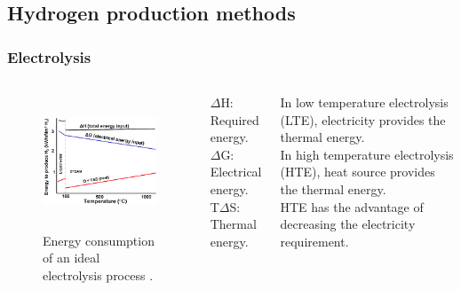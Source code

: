\subsection{Hydrogen production methods}
\begin{frame}
\frametitle{Electrolysis}
\begin{columns}
    \column[t]{5cm}
	\begin{figure}[htbp!]
		\begin{center}
			\includegraphics[height=4.0cm]{images/ele-curve.png}
		\end{center}
		\caption{Energy consumption of an ideal electrolysis process \cite{hi2h2_highly_2007}.}
	\end{figure}

	\column[t]{5cm}
	$\Delta$H: Required energy.
	\\
	$\Delta$G: Electrical energy.
	\\
	T$\Delta$S: Thermal energy. \vspace{0.7cm}

    In low temperature electrolysis (LTE), electricity provides the thermal energy.
    \\
    In high temperature electrolysis (HTE), heat source provides the thermal energy.
    \\
    HTE has the advantage of decreasing the electricity requirement.
    
\end{columns}
\end{frame}


